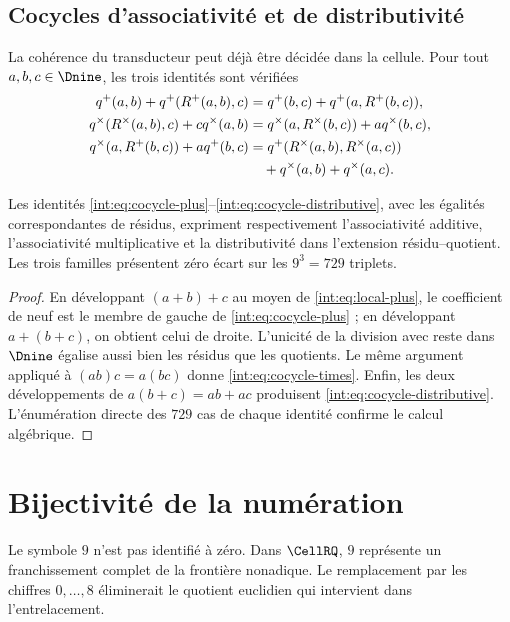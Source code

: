 \subsection{Cocycles d'associativité et de distributivité}

La cohérence du transducteur peut déjà être décidée dans la cellule. Pour tout
$a,b,c\in\Dnine$, les trois identités sont vérifiées
\begin{align}
q^+(a,b)+q^+(R^+(a,b),c)
&=q^+(b,c)+q^+(a,R^+(b,c)),\label{int:eq:cocycle-plus}\\
q^\times(R^\times(a,b),c)+cq^\times(a,b)
&=q^\times(a,R^\times(b,c))+aq^\times(b,c),
\label{int:eq:cocycle-times}\\
q^\times(a,R^+(b,c))+aq^+(b,c)
&=q^+(R^\times(a,b),R^\times(a,c))\notag\\
&\quad+q^\times(a,b)+q^\times(a,c).
\label{int:eq:cocycle-distributive}
\end{align}

\begin{theorem}
Les identités \eqref{int:eq:cocycle-plus}--\eqref{int:eq:cocycle-distributive},
avec les égalités correspondantes de résidus, expriment
respectivement l'associativité additive, l'associativité multiplicative et la
distributivité dans l'extension résidu--quotient. Les trois familles présentent
zéro écart sur les $9^3=729$ triplets.
\end{theorem}

\begin{proof}
En développant $(a+b)+c$ au moyen de \eqref{int:eq:local-plus}, le coefficient de
neuf est le membre de gauche de \eqref{int:eq:cocycle-plus} ; en développant
$a+(b+c)$, on obtient celui de droite. L'unicité de la division avec reste dans
$\Dnine$ égalise aussi bien les résidus que les quotients. Le même argument appliqué à
$(ab)c=a(bc)$ donne \eqref{int:eq:cocycle-times}. Enfin, les deux développements de
$a(b+c)=ab+ac$ produisent \eqref{int:eq:cocycle-distributive}. L'énumération
directe des \(729\) cas de chaque identité confirme le calcul
algébrique.
\end{proof}

\section{Bijectivité de la numération}

Le symbole $9$ n'est pas identifié à zéro. Dans $\CellRQ$, $9$ représente un
franchissement complet de la frontière nonadique. Le remplacement par les chiffres
$0,\ldots,8$ éliminerait le quotient euclidien qui intervient dans
l'entrelacement.

